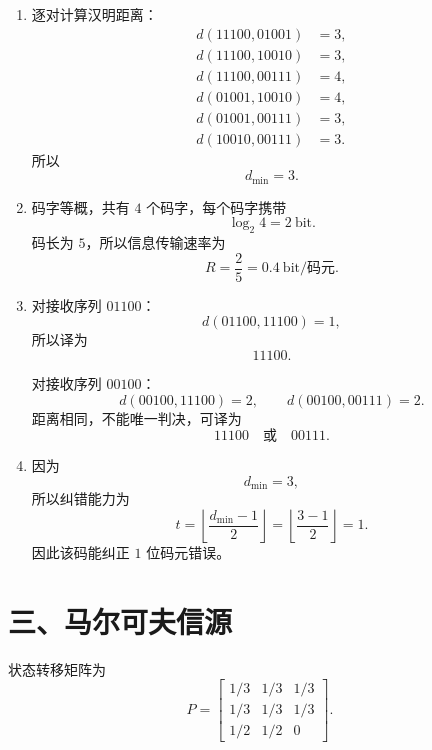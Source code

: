 \documentclass[UTF8,a4paper,12pt]{ctexart}
\begin{document}
\begin{enumerate}[label=\arabic*., leftmargin=2em]
\item 逐对计算汉明距离：
\[
\begin{aligned}
d(11100,01001)&=3,\\
d(11100,10010)&=3,\\
d(11100,00111)&=4,\\
d(01001,10010)&=4,\\
d(01001,00111)&=3,\\
d(10010,00111)&=3.
\end{aligned}
\]
所以
\[
d_{\min}=3.
\]

\item 码字等概，共有 $4$ 个码字，每个码字携带
\[
\log_2 4=2\ \text{bit}.
\]
码长为 $5$，所以信息传输速率为
\[
R=\frac{2}{5}=0.4\ \text{bit/码元}.
\]

\item 对接收序列 $01100$：
\[
d(01100,11100)=1,
\]
所以译为
\[
11100.
\]

对接收序列 $00100$：
\[
d(00100,11100)=2,\qquad d(00100,00111)=2.
\]
距离相同，不能唯一判决，可译为
\[
11100\quad \text{或}\quad 00111.
\]

\item 因为
\[
d_{\min}=3,
\]
所以纠错能力为
\[
t=\left\lfloor\frac{d_{\min}-1}{2}\right\rfloor
=\left\lfloor\frac{3-1}{2}\right\rfloor=1.
\]
因此该码能纠正 $1$ 位码元错误。
\end{enumerate}

\section*{三、马尔可夫信源}

状态转移矩阵为
\[
P=
\begin{bmatrix}
1/3&1/3&1/3\\
1/3&1/3&1/3\\
1/2&1/2&0
\end{bmatrix}.
\]
\end{document}
